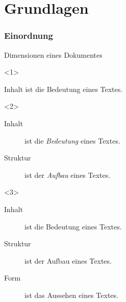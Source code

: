 \malte

\label{chapter-grundlagen}
\chapter{Grundlagen}


\website

\jonny


\subsection{Einordnung}

\begin{Frame}{Dimensionen eines Dokumentes}
  \begin{onlyenv}<1>
    \begin{center}
      Inhalt ist die Bedeutung eines Textes.
    \end{center}
  \end{onlyenv}
  \begin{onlyenv}<2>
    \begin{description}
      \item[\textnormal{\color{black}Inhalt}] ist die \emph{Bedeutung} eines Textes.
      \item[\textnormal{\color{black}Struktur}] ist der \emph{Aufbau} eines Textes.
    \end{description}
  \end{onlyenv}
  \begin{onlyenv}<3>
    \begin{description}
      \item[Inhalt] ist die \alert{Bedeutung} eines Textes.
      \item[Struktur] ist der \alert{Aufbau} eines Textes.
      \item[Form] ist das \alert{Aussehen} eines Textes.
    \end{description}
  \end{onlyenv}
\end{Frame}

